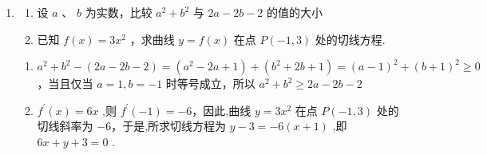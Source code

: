 \begin{enumerate}
\begin{jieda}
        所以 $m + {2n} = \dfrac{1}{t} + \dfrac{1}{{t}^{2}} + 2\left( {\ln t - \dfrac{2}{t} - 1}\right)  = \dfrac{1}{{t}^{2}} + 2\ln t - \dfrac{3}{t} - 2$ 
        
        令 $g\left( x\right)  = \dfrac{1}{{x}^{2}} + 2\ln x - \dfrac{3}{x} - 2\left( {x > 0}\right)$ ,则 ${g}^{\prime }\left( x\right)  =  - \dfrac{2}{{x}^{3}} + \dfrac{2}{x} + \dfrac{3}{{x}^{2}} = \dfrac{2{x}^{2} + {3x} - 2}{{x}^{3}}$ 
        
        令 ${g}^{\prime }\left( x\right)  = 0$ ,解得 $x = \dfrac{1}{2}$ 
        
        当 $0 < x < \dfrac{1}{2}$ 时, ${g}^{\prime }\left( x\right)  < 0,g\left( x\right)$ 单调递减，当 $x > \dfrac{1}{2}$ 时, ${g}^{\prime }\left( x\right)  > 0,g\left( x\right)$ 单调递增
        
        故 $g{\left( x\right) }_{\min } = g\left( \dfrac{1}{2}\right)  =  - 2\ln 2 - 4$，则 $m + {2n}$ 的取值范围是 $\lbrack  - 2\ln 2 - 4, + \infty )$
    \end{jieda}

    \item 
    \begin{enumerate}
        \item 设 $a$ 、 $b$ 为实数，比较 ${a}^{2} + {b}^{2}$ 与 ${2a} - {2b} - 2$ 的值的大小
        \item 已知 $f\left( x\right)  = 3{x}^{2}$ ，求曲线 $y = f\left( x\right)$ 在点 $P\left( {-1,3}\right)$ 处的切线方程.
    \end{enumerate}
    \begin{jieda}
        \begin{enumerate}
            \item  ${a}^{2} + {b}^{2} - \left( {{2a} - {2b} - 2}\right)  = \left( {{a}^{2} - {2a} + 1}\right)  + \left( {{b}^{2} + {2b} + 1}\right)  = {\left( a - 1\right) }^{2} + {\left( b + 1\right) }^{2} \geq  0$，当且仅当 $a = 1,b =  - 1$ 时等号成立，所以 ${a}^{2} + {b}^{2} \geq  {2a} - {2b} - 2$ 
            
            \item ${f}^{\prime }\left( x\right)  = {6x}$ ,则 ${f}^{\prime }\left( {-1}\right)  =  - 6$，因此,曲线 $y = 3{x}^{2}$ 在点 $P\left( {-1,3}\right)$ 处的切线斜率为 $-6$，于是,所求切线方程为 $y - 3 =  - 6\left( {x + 1}\right)$ ,即 ${6x} + y + 3 = 0$ .
        \end{enumerate}
    \end{jieda}
\end{enumerate}

